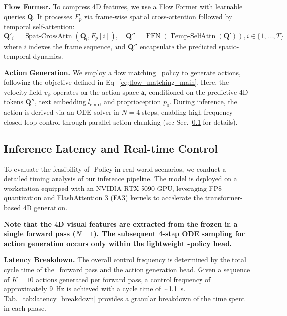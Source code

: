 \noindent
\textbf{Flow Former.}
To compress 4D features, we use a Flow Former with learnable queries $\bm{Q}$. It processes $F_p$ via frame-wise spatial cross-attention followed by temporal self-attention:
\begin{equation}
 \bm{Q}'_i = \operatorname{Spat-CrossAttn}(\bm{Q}_i, F_p[i]), \quad \bm{Q}'' = \operatorname{FFN}(\operatorname{Temp-SelfAttn}(\bm{Q}')), i \in \{1, \dots, T\}
\end{equation}
where $i$ indexes the frame sequence, and $\bm{Q}''$ encapsulate the predicted spatio-temporal dynamics.

\noindent
\textbf{Action Generation.}
We employ a flow matching~\citep{lipman2022flow} policy to generate actions, following the objective defined in Eq.~\ref{eq:flow_matching_main}. Here, the velocity field $v_\phi$ operates on the action space $\bm{a}$, conditioned on the predictive 4D tokens $\bm{Q}''$, text embedding $l_{\text{emb}}$, and proprioception $p_0$. During inference, the action is derived via an ODE solver in $N=4$ steps, enabling high-frequency closed-loop control through parallel action chunking (see Sec.~\ref{appendix:latency} for details).




\subsection{Inference Latency and Real-time Control}
\label{appendix:latency}
To evaluate the feasibility of \our-Policy in real-world scenarios, we conduct a detailed timing analysis of our inference pipeline. The model is deployed on a workstation equipped with an NVIDIA RTX 5090 GPU, leveraging FP8 quantization and FlashAttention 3 (FA3) kernels to accelerate the transformer-based 4D generation.

\textbf{Note that the 4D visual features are extracted from the frozen \our in a single forward pass ($N=1$). The subsequent 4-step ODE sampling for action generation occurs only within the lightweight \our-policy head.}

\noindent 
\textbf{Latency Breakdown.}
The overall control frequency is determined by the total cycle time of the \our\ forward pass and the action generation head. Given a sequence of $K=10$ actions generated per forward pass, a control frequency of approximately 9~Hz is achieved with a cycle time of $\sim$1.1~s. Tab.~\ref{tab:latency_breakdown} provides a granular breakdown of the time spent in each phase.

